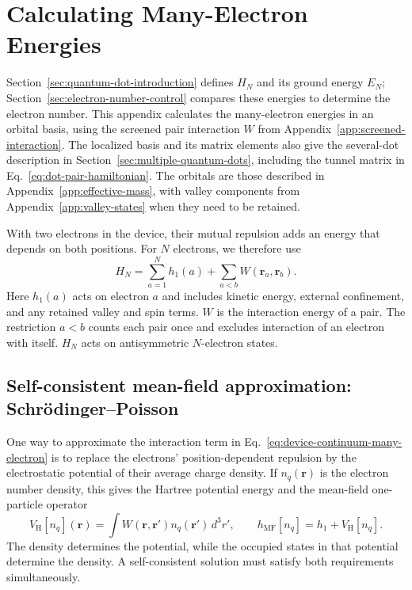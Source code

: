 \FloatBarrier
\section{Calculating Many-Electron Energies}
\label{app:interacting-models}
\label{sec:interacting-electron-models}

Section~\ref{sec:quantum-dot-introduction} defines $H_N$ and its ground
energy $E_N$; Section~\ref{sec:electron-number-control} compares these
energies to determine the electron number. This appendix calculates
the many-electron energies in an orbital basis, using the screened
pair interaction $W$ from Appendix~\ref{app:screened-interaction}.
The localized basis and its matrix elements also give the several-dot description in
Section~\ref{sec:multiple-quantum-dots}, including the tunnel matrix
in Eq.~\eqref{eq:dot-pair-hamiltonian}.
The orbitals are those described in
Appendix~\ref{app:effective-mass}, with valley components from
Appendix~\ref{app:valley-states} when they need to be retained.

With two electrons in the device, their mutual repulsion adds
an energy that depends on both positions. For $N$ electrons,
we therefore use
\begin{equation}
 H_N=\sum_{a=1}^{N}h_1(a)
       +\sum_{a<b}W(\mathbf r_a,\mathbf r_b).
 \label{eq:device-continuum-many-electron}
\end{equation}
Here $h_1(a)$ acts on electron $a$ and includes kinetic energy,
external confinement, and any retained valley and spin terms.
$W$ is the interaction energy of a pair. The restriction $a<b$
counts each pair once and excludes interaction of an electron
with itself. $H_N$ acts on antisymmetric $N$-electron states.

\subsection{Self-consistent mean-field approximation: Schr\"odinger--Poisson}
\label{sec:device-schrodinger-poisson}

One way to approximate the interaction term in
Eq.~\eqref{eq:device-continuum-many-electron} is to replace the
electrons' position-dependent repulsion by the electrostatic
potential of their average charge density. If $n_q(\mathbf r)$
is the electron number density, this gives the Hartree potential
energy and the mean-field one-particle operator
\begin{equation}
 V_{\mathrm H}[n_q](\mathbf r)
       =\int W(\mathbf r,\mathbf r')n_q(\mathbf r')\,d^3r',
 \qquad
 h_{\mathrm{MF}}[n_q]=h_1+V_{\mathrm H}[n_q].
 \label{eq:device-hartree-mean-field}
\end{equation}
The density determines the potential, while the occupied states
in that potential determine the density. A self-consistent solution
must satisfy both requirements simultaneously.


